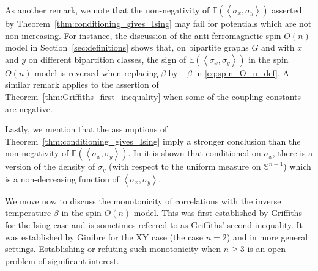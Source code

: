 \documentclass[12pt,reqno]{article}
\def\E{\mathbb{E}}
\renewcommand{\S}{\mathbb{S}}
\begin{document}
As another remark, we note that the non-negativity of $\E(\left\langle\sigma_x,\sigma_y\right\rangle)$ asserted by
Theorem~\ref{thm:conditioning_gives_Ising} may fail for
potentials which are not non-increasing. For instance, the
discussion of the anti-ferromagnetic spin $O(n)$ model in
Section~\ref{sec:definitions} shows that, on bipartite
graphs $G$ and with $x$ and $y$ on different bipartition classes,
the sign of $\E(\left\langle\sigma_x,\sigma_y\right\rangle)$ in the
spin $O(n)$ model is reversed when replacing $\beta$ by $-\beta$ in
\eqref{eq:spin_O_n_def}. A similar remark applies to the assertion
of Theorem~\ref{thm:Griffiths_first_inequality} when some of the
coupling constants are negative.

Lastly, we mention that the assumptions of
Theorem~\ref{thm:conditioning_gives_Ising} imply a stronger conclusion than the non-negativity of $\E(\left\langle\sigma_x,\sigma_y\right\rangle)$. In \cite{CohenAlloro2018} it is shown
that conditioned on $\sigma_x$, there is a version of the density of
$\sigma_y$ (with respect to the uniform measure on $\S^{n-1}$) which is a non-decreasing function of $\left\langle\sigma_x,\sigma_y\right\rangle$.

We move now to discuss the monotonicity of correlations with the
inverse temperature $\beta$ in the spin $O(n)$ model. This was first established by Griffiths
for the Ising case \cite{Gri67} and is sometimes referred to as Griffiths' second inequality. It was established by Ginibre \cite{Gin70} for the XY case (the case $n=2$) and in more general settings. Establishing or refuting such monotonicity when $n\ge 3$ is an open problem of significant interest.
\end{document}
